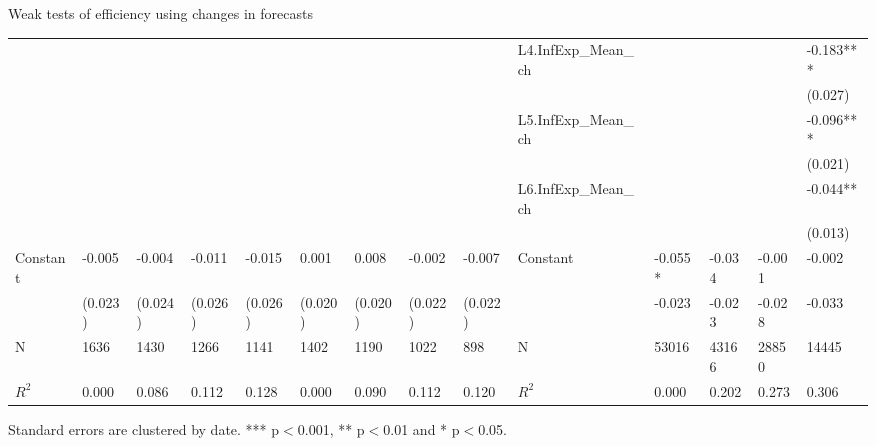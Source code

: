 \documentclass{beamer}
\begin{document}
\begin{frame}{Weak tests of efficiency using changes in forecasts }
\begin{adjustbox}{width=\textwidth}
\begin{threeparttable}
\begin{tabular}{llllllllllllll}
			&             &           &           &           &               &           &           &           & L4.InfExp\_Mean\_ch &         &           &           & -0.183*** \\
			
			&             &           &           &           &               &           &           &           &                                 &         &           &           & (0.027)    \\
			&             &           &           &           &               &           &           &           & L5.InfExp\_Mean\_ch &         &           &           & -0.096*** \\
			&             &           &           &           &               &           &           &           &                      &         &           &           & (0.021)    \\
			&             &           &           &           &               &           &           &           & L6.InfExp\_Mean\_ch &         &           &           & -0.044**  \\
			&             &           &           &           &               &           &           &           &                                     &         &           &           & (0.013)    \\
			Constant               & -0.005      & -0.004    & -0.011    & -0.015    & 0.001         & 0.008     & -0.002    & -0.007    & Constant              & -0.055* & -0.034    & -0.001    & -0.002    \\
			& (0.023)     & (0.024)   & (0.026)   & (0.026)   & (0.020)       & (0.020)   & (0.022)   & (0.022)   &                                 & -0.023  & -0.023    & -0.028    & -0.033    \\
			\hline 
			N                    & 1636        & 1430      & 1266      & 1141      & 1402          & 1190      & 1022      & 898       & N                   & 53016   & 43166     & 28850     & 14445     \\
			$R^2$                  & 0.000       & 0.086     & 0.112     & 0.128     & 0.000         & 0.090     & 0.112     & 0.120     & $R^2$ &  0.000       & 0.202     & 0.273     & 0.306   \\
			\hline 
		\end{tabular}
		\begin{tablenotes}
			\item Standard errors are clustered by date. *** p$<$0.001, ** p$<$0.01 and * p$<$0.05.
		\end{tablenotes}
	\end{threeparttable}
\end{adjustbox}
\end{frame}
\end{document}
